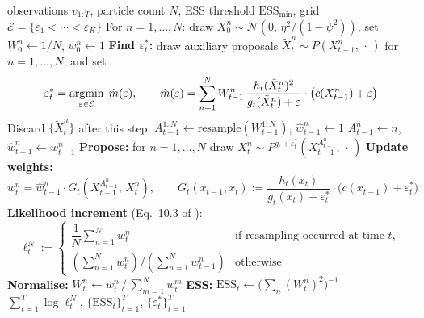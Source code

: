 \documentclass[11pt,reqno]{amsart}
\newcommand{\argmin}{\operatornamewithlimits{argmin}}
\theoremstyle{definition}
\begin{document}
\begin{algorithm}
\caption{Adaptive GPF with $\varepsilon_t^*$ chosen by weighted grid search}
\label{alg:gpf_adaptive}
\begin{algorithmic}[1]
\Require observations $v_{1:T}$, particle count $N$,
  ESS threshold $\mathrm{ESS}_{\min}$,
  grid $\mathcal{E} = \{\varepsilon_1 < \cdots < \varepsilon_K\}$
\State For $n=1,\ldots,N$: draw
  $X_0^n \sim \mathcal{N}(0,\,\eta^2/(1-\psi^2))$,
  set $W_0^n \leftarrow 1/N$, $w_0^n \leftarrow 1$
  \State \textbf{Find $\varepsilon_t^*$:} draw auxiliary proposals
    $\tilde{X}_t^n \sim P(X_{t-1}^n,\,\cdot\,)$ for $n=1,\ldots,N$, and set
    \[
      \varepsilon_t^* = \argmin_{\varepsilon \in \mathcal{E}}\;
        \hat{m}(\varepsilon), \qquad
      \hat{m}(\varepsilon) =
        \sum_{n=1}^N W_{t-1}^n\,
        \frac{h_t(\tilde{X}_t^n)^2}{g_t(\tilde{X}_t^n)+\varepsilon}
        \cdot\bigl(c(X_{t-1}^n)+\varepsilon\bigr)
    \]
    Discard $\{\tilde{X}_t^n\}$ after this step.
    \State $A_{t-1}^{1:N} \leftarrow \mathrm{resample}(W_{t-1}^{1:N})$,\quad
      $\hat{w}_{t-1}^n \leftarrow 1$
  \Else
    \State $A_{t-1}^n \leftarrow n$,\quad
      $\hat{w}_{t-1}^n \leftarrow w_{t-1}^n$
  \EndIf
  \State \textbf{Propose:} for $n=1,\ldots,N$ draw
    $X_t^n \sim P^{g_t+\varepsilon_t^*}\!\left(X_{t-1}^{A_{t-1}^n},\,\cdot\,\right)$
  \State \textbf{Update weights:}
    \[
      w_t^n = \hat{w}_{t-1}^n \cdot G_t\!\left(X_{t-1}^{A_{t-1}^n},\,X_t^n\right),
      \qquad
      G_t(x_{t-1},x_t) :=
        \frac{h_t(x_t)}{g_t(x_t)+\varepsilon_t^*}
        \cdot\bigl(c(x_{t-1})+\varepsilon_t^*\bigr)
    \]
  \State \textbf{Likelihood increment} (Eq.~10.3 of
    \cite{CP}):
    \[
      \ell_t^N :=
      \begin{cases}
        \dfrac{1}{N}\displaystyle\sum_{n=1}^N w_t^n
          & \text{if resampling occurred at time }t,\\[8pt]
           \left(\sum_{n=1}^N w_t^n\right)/\left(\sum_{n=1}^N w_{t-1}^n\right)
          & \text{otherwise}
      \end{cases}
    \]
  \State \textbf{Normalise:}\quad
    $W_t^n \leftarrow w_t^n \,/\, \sum_{m=1}^N w_t^m$
  \State \textbf{ESS:}\quad
    $\mathrm{ESS}_t \leftarrow \bigl(\sum_n (W_t^n)^2\bigr)^{-1}$
\EndFor
\State \Return
  $\sum_{t=1}^T \log \ell_t^N$,\quad
  $\{\mathrm{ESS}_t\}_{t=1}^T$,\quad
  $\{\varepsilon_t^*\}_{t=1}^T$
\end{algorithmic}
\end{algorithm}
\end{document}
